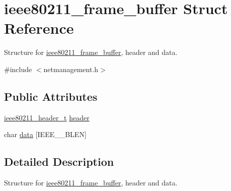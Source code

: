 \hypertarget{structieee80211__frame__buffer}{\section{ieee80211\-\_\-frame\-\_\-buffer \-Struct \-Reference}
\label{structieee80211__frame__buffer}
}


\-Structure for \hyperlink{structieee80211__frame__buffer}{ieee80211\-\_\-frame\-\_\-buffer}, header and data.  




{\ttfamily \#include $<$netmanagement.\-h$>$}

\subsection*{\-Public \-Attributes}
\begin{DoxyCompactItemize}
\item 
\hyperlink{structieee80211__header}{ieee80211\-\_\-header\-\_\-t} \hyperlink{structieee80211__frame__buffer_ac60e3de25c452f9f6732fab6de4611b6}{header}
\item 
char \hyperlink{structieee80211__frame__buffer_a8606b935b67137224596a96da05f532c}{data} \mbox{[}\-I\-E\-E\-E\-\_\-\_\-\-B\-L\-E\-N\mbox{]}
\end{DoxyCompactItemize}


\subsection{\-Detailed \-Description}
\-Structure for \hyperlink{structieee80211__frame__buffer}{ieee80211\-\_\-frame\-\_\-buffer}, header and data. 

